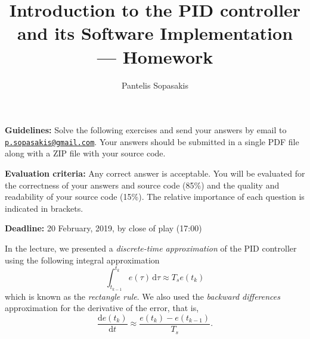 \documentclass[a4paper,10pt,reqno]{amsart}
\title[PID Controller]{Introduction to the PID controller and its Software Implementation --- Homework}
\author[P. Sopasakis]{Pantelis Sopasakis}
\numberwithin{equation}{section}
\theoremstyle{plain}
\renewcommand{\d}{\mathrm{d}}
\begin{document}
\maketitle
\noindent \textbf{Guidelines:} 
Solve the following exercises and send your answers by email to
\href{mailto:p.sopasakis@gmail.com}{\texttt{p.sopasakis@gmail.com}}.
Your answers should be submitted in a single PDF file along with a ZIP file with your source 
code.

\vspace{1em}

\noindent \textbf{Evaluation criteria:} Any correct answer is acceptable. You will be evaluated 
for the correctness of your answers and source code (85\%) and the quality and readability of 
your source code (15\%). The relative importance of each question is indicated in brackets.

\vspace{1em}

\noindent  \textbf{Deadline:} 20 February, 2019, by close of play (17:00)

\vspace{1em}
 In the lecture, we presented a \textit{discrete-time approximation} of the 
       PID controller using the following integral approximation
       \begin{equation}
        \int_{t_{k-1}}^{t_k} e(\tau)\, {}\mathrm{d}\tau {}\approx{} T_s e(t_k)\tag{1a}
       \end{equation}       
       which is known as the \textit{rectangle rule}. We also used the \textit{backward differences}
       approximation for the derivative of the error, that is,
       \[
        \frac{\d e(t_k)}{\d t} \approx \frac{e(t_k) - e(t_{k-1})}{T_s}\tag{1b}\label{eq:1b}.
       \]
\end{document}
